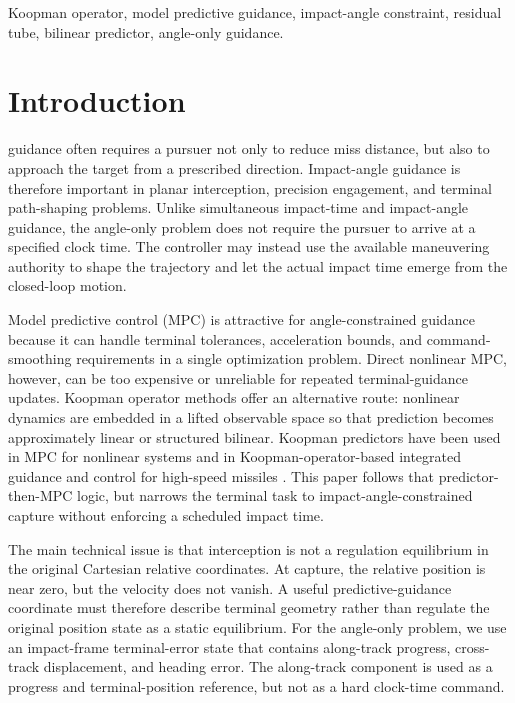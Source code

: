 \documentclass[letterpaper,journal]{IEEEtran}
\begin{document}
\begin{IEEEkeywords}
Koopman operator, model predictive guidance, impact-angle constraint, residual tube, bilinear predictor, angle-only guidance.
\end{IEEEkeywords}

\section{Introduction}
 guidance often requires a pursuer not only to reduce miss distance, but also to approach the target from a prescribed direction. Impact-angle guidance is therefore important in planar interception, precision engagement, and terminal path-shaping problems. Unlike simultaneous impact-time and impact-angle guidance, the angle-only problem does not require the pursuer to arrive at a specified clock time. The controller may instead use the available maneuvering authority to shape the trajectory and let the actual impact time emerge from the closed-loop motion.

Model predictive control (MPC) is attractive for angle-constrained guidance because it can handle terminal tolerances, acceleration bounds, and command-smoothing requirements in a single optimization problem. Direct nonlinear MPC, however, can be too expensive or unreliable for repeated terminal-guidance updates. Koopman operator methods offer an alternative route: nonlinear dynamics are embedded in a lifted observable space so that prediction becomes approximately linear or structured bilinear. Koopman predictors have been used in MPC for nonlinear systems and in Koopman-operator-based integrated guidance and control for high-speed missiles \cite{korda2018mpc,bevanda2021kodm,zhou2024klmpc}. This paper follows that predictor-then-MPC logic, but narrows the terminal task to impact-angle-constrained capture without enforcing a scheduled impact time.

The main technical issue is that interception is not a regulation equilibrium in the original Cartesian relative coordinates. At capture, the relative position is near zero, but the velocity does not vanish. A useful predictive-guidance coordinate must therefore describe terminal geometry rather than regulate the original position state as a static equilibrium. For the angle-only problem, we use an impact-frame terminal-error state that contains along-track progress, cross-track displacement, and heading error. The along-track component is used as a progress and terminal-position reference, but not as a hard clock-time command.
\end{document}

